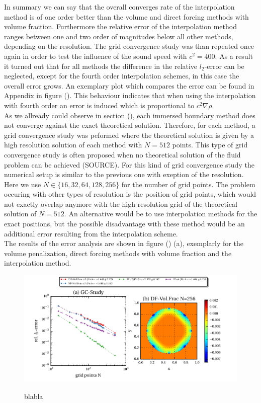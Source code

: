 In summary we can say that the overall converges rate of the interpolation method is of one order better
than the volume and direct forcing methods with volume fraction. Furthermore the relative error of the interpolation method ranges
between one and two order of magnitudes below all other methods, depending on the resolution.
The grid convergence study was than repeated once again in order to test the influence of the sound speed with $c^2 = 400$.
As a result it turned out that for all methods the difference in the relative $l_2$-error can be neglected, except
for the fourth order interpolation schemes, in this case the overall error grows. An exemplary plot which compares
the error can be found in Appendix in figure (). This behaviour indicates that when using the interpolation with fourth order
an error is induced which is proportional to $c^2\nabla \rho$.\\
As we allready could observe in section (), each immersed boundary method does not converge against the exact theoretical solution.
Therefore, for each method, a grid convergence study was peformed where the theoretical solution is given by a
high resolution solution of each method with $N=512$ points. This type of grid convergence study is often proposed
when no theoretical solution of the fluid problem can be achieved (SOURCE).
For this kind of grid convergence study the numerical setup is similar to the previous one with exeption of the resolution.
Here we use $N\in\{16, 32, 64, 128, 256\}$ for the number of grid points.
The problem occuring with other types of resolution is the position of grid points, which would not exactly overlap anymore with
the high resolution grid  of the theoretical solution of $N=512$.
An alternative would be to use interpolation methods for the exact positions, but the possible disadvantage with these method
would be an additional error resulting from the interpolation scheme.\\
The results of the error analysis are shown in figure () (a), exemplarly for the volume penalization, direct forcing  methods with volume fraction
and the interpolation method.

\begin{figure}[!pb]
  \centering
  \includegraphics{gfx/immersed_boundary/hpflow/hd/all.pdf}\label{fig:hpflow_allgc_theo}
  \caption{blabla}
\end{figure}

